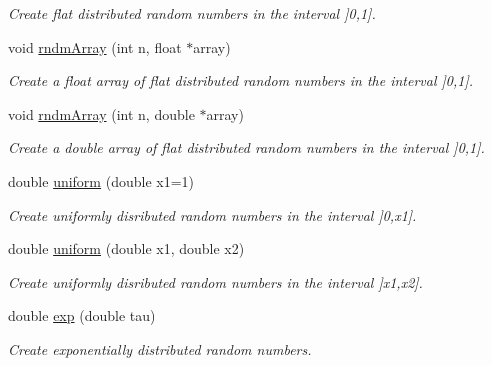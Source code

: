\begin{DoxyCompactItemize}
\begin{DoxyCompactList}\small\item\em Create flat distributed random numbers in the interval \mbox{]}0,1\mbox{]}. \item\end{DoxyCompactList}\item 
void \hyperlink{class_d_d4hep_1_1_simulation_1_1_geant4_random_aaf9f4a7acf4d65ce0b3f6b19486d473d}{rndmArray} (int n, float $\ast$array)
\begin{DoxyCompactList}\small\item\em Create a float array of flat distributed random numbers in the interval \mbox{]}0,1\mbox{]}. \item\end{DoxyCompactList}\item 
void \hyperlink{class_d_d4hep_1_1_simulation_1_1_geant4_random_a45700086c1a78f0982bd5539e9263895}{rndmArray} (int n, double $\ast$array)
\begin{DoxyCompactList}\small\item\em Create a double array of flat distributed random numbers in the interval \mbox{]}0,1\mbox{]}. \item\end{DoxyCompactList}\item 
double \hyperlink{class_d_d4hep_1_1_simulation_1_1_geant4_random_af0c23cab921aa21e6707eae5091aba15}{uniform} (double x1=1)
\begin{DoxyCompactList}\small\item\em Create uniformly disributed random numbers in the interval \mbox{]}0,x1\mbox{]}. \item\end{DoxyCompactList}\item 
double \hyperlink{class_d_d4hep_1_1_simulation_1_1_geant4_random_a5e717c2a88ed9c72dcfb8e2de1c4bef3}{uniform} (double x1, double x2)
\begin{DoxyCompactList}\small\item\em Create uniformly disributed random numbers in the interval \mbox{]}x1,x2\mbox{]}. \item\end{DoxyCompactList}\item 
double \hyperlink{class_d_d4hep_1_1_simulation_1_1_geant4_random_a676f18f9a0f12e26e67f5390c2f6a5b7}{exp} (double tau)
\begin{DoxyCompactList}\small\item\em Create exponentially distributed random numbers. \item\end{DoxyCompactList}\item 

\end{DoxyCompactItemize}
